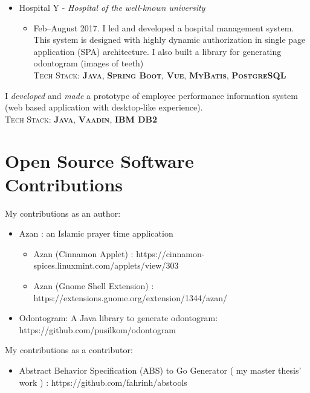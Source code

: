 \documentclass[11pt,a4paper,sans]{moderncv} %
\begin{document}
{\begin{itemize}
\begin{itemize}
  \end{itemize}
  \item Hospital Y - \textit{Hospital of the well-known university}
  \begin{itemize}
      \item Feb--August 2017. I led and developed a hospital management system. This system is designed with highly dynamic authorization in single page application (SPA) architecture. I also built a library for generating odontogram (images of teeth)\\ \textsc{Tech Stack: \textbf{Java}, \textbf{Spring Boot}, \textbf{Vue}, \textbf{MyBatis}, \textbf{PostgreSQL}}
  \end{itemize}
\end{itemize}
}

{
I \textit{developed} and \textit{made} a prototype of employee performance information system (web based application with desktop-like experience).\\
\textsc{Tech Stack: \textbf{Java}, \textbf{Vaadin}, \textbf{IBM DB2}}
}

\section{Open Source Software Contributions}
{
My contributions as an author:
\begin{itemize}
      \item Azan : an Islamic prayer time application
      \begin{itemize}
        \item Azan (Cinnamon Applet) : https://cinnamon-spices.linuxmint.com/applets/view/303
        \item Azan (Gnome Shell Extension) : https://extensions.gnome.org/extension/1344/azan/
      \end{itemize}
      \item Odontogram: A Java library to generate odontogram:  https://github.com/pusilkom/odontogram
 \end{itemize}
}
{
My contributions as a contributor:
\begin{itemize}
    \item Abstract Behavior Specification (ABS) to Go Generator ( my master thesis' work ) : https://github.com/fahrinh/abstools
\end{itemize}
}
\end{document}

